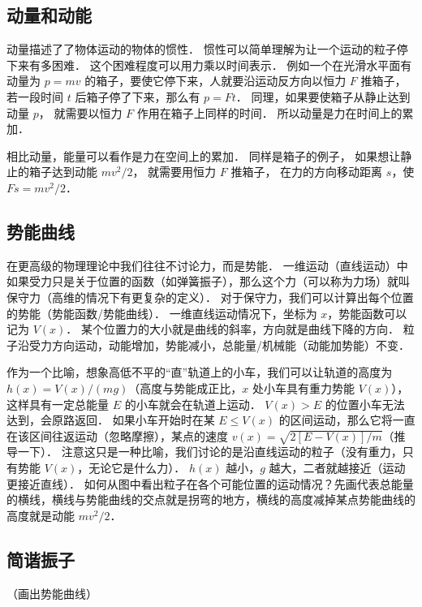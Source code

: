 

\subsection{动量和动能}
动量描述了了物体运动的物体的惯性． 惯性可以简单理解为让一个运动的粒子停下来有多困难． 这个困难程度可以用力乘以时间表示． 例如一个在光滑水平面有动量为 $p = mv$ 的箱子，要使它停下来，人就要沿运动反方向以恒力 $F$ 推箱子， 若一段时间 $t$ 后箱子停了下来，那么有 $p = Ft$．%
同理，如果要使箱子从静止达到动量 $p$， 就需要以恒力 $F$ 作用在箱子上同样的时间． 所以动量是力在时间上的累加．

相比动量，能量可以看作是力在空间上的累加． 同样是箱子的例子， 如果想让静止的箱子达到动能 $mv^2/2$， 就需要用恒力 $F$ 推箱子， 在力的方向移动距离 $s$，使 $Fs = mv^2/2$．

\subsection{势能曲线}
在更高级的物理理论中我们往往不讨论力，而是势能． 一维运动（直线运动）中如果受力只是关于位置的函数（如弹簧振子），那么这个力（可以称为力场）就叫保守力（高维的情况下有更复杂的定义）． 对于保守力，我们可以计算出每个位置的势能（势能函数/势能曲线）． 一维直线运动情况下，坐标为 $x$，势能函数可以记为 $V(x)$． 某个位置力的大小就是曲线的斜率，方向就是曲线下降的方向． 粒子沿受力方向运动，动能增加，势能减小，总能量/机械能（动能加势能）不变．

作为一个比喻，想象高低不平的“直”轨道上的小车，我们可以让轨道的高度为 $h(x) = V(x)/(mg)$（高度与势能成正比，$x$ 处小车具有重力势能 $V(x)$），这样具有一定总能量 $E$ 的小车就会在轨道上运动． $V(x) > E$ 的位置小车无法达到，会原路返回． 如果小车开始时在某 $E \leq V(x)$ 的区间运动，那么它将一直在该区间往返运动（忽略摩擦），某点的速度 $v(x) = \sqrt{2[E - V(x)]/m}$（推导一下）． 注意这只是一种比喻，我们讨论的是沿直线运动的粒子（没有重力，只有势能 $V(x)$，无论它是什么力）． $h(x)$ 越小，$g$ 越大，二者就越接近（运动更接近直线）． 如何从图中看出粒子在各个可能位置的运动情况？先画代表总能量的横线，横线与势能曲线的交点就是拐弯的地方，横线的高度减掉某点势能曲线的高度就是动能 $mv^2/2$．

\subsection{简谐振子}
（画出势能曲线）

